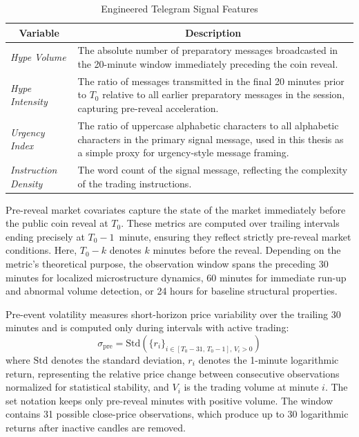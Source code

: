 \begin{table}[H]
\centering
\caption{Engineered Telegram Signal Features}
\label{tab:telegram-variables}
\begin{tabular}{|l|p{11cm}|}
\toprule
\multicolumn{1}{|c|}{\textbf{Variable}} & \multicolumn{1}{c|}{\textbf{Description}} \\
\midrule
\textit{Hype Volume} & The absolute number of preparatory messages broadcasted in the 20-minute window immediately preceding the coin reveal. \\
\textit{Hype Intensity} & The ratio of messages transmitted in the final 20 minutes prior to $T_0$ relative to all earlier preparatory messages in the session, capturing pre-reveal acceleration. \\
\textit{Urgency Index} & The ratio of uppercase alphabetic characters to all alphabetic characters in the primary signal message, used in this thesis as a simple proxy for urgency-style message framing. \\
\textit{Instruction Density} & The word count of the signal message, reflecting the complexity of the trading instructions. \\
\bottomrule
\end{tabular}
\ownsource
\end{table}

Pre-reveal market covariates capture the state of the market immediately before the public coin reveal at $T_0$. These metrics are computed over trailing intervals ending precisely at $T_0 - 1$~minute, ensuring they reflect strictly pre-reveal market conditions. Here, $T_0-k$ denotes $k$ minutes before the reveal. Depending on the metric's theoretical purpose, the observation window spans the preceding 30 minutes for localized microstructure dynamics, 60 minutes for immediate run-up and abnormal volume detection, or 24 hours for baseline structural properties.

Pre-event volatility measures short-horizon price variability over the trailing 30 minutes and is computed only during intervals with active trading:
\begin{equation}
    \label{eq:pre_vol}
    \sigma_{\text{pre}} = \mathrm{Std}\!\left(\{r_i\}_{i \in [T_0-31,\, T_0-1],\, V_i > 0}\right)
\end{equation}
where $\mathrm{Std}$ denotes the standard deviation, $r_i$ denotes the 1-minute logarithmic return, representing the relative price change between consecutive observations normalized for statistical stability, and $V_i$ is the trading volume at minute $i$. The set notation keeps only pre-reveal minutes with positive volume. The window contains 31 possible close-price observations, which produce up to 30 logarithmic returns after inactive candles are removed.

